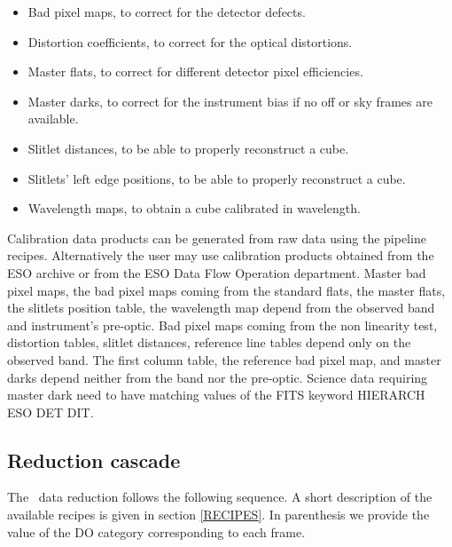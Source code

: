 \begin{itemize}
\begin{itemize}
\item Bad pixel maps, to correct for the detector defects.
\item Distortion coefficients, to correct for the optical distortions.
\item Master flats, to correct for different detector pixel efficiencies.
\item Master darks, to correct for the instrument bias if no off or sky 
frames are available.
\item Slitlet distances, to be able to properly reconstruct a cube.
\item Slitlets' left edge positions, to be able to properly reconstruct a cube.
\item Wavelength maps, to obtain a cube calibrated in wavelength.
\end{itemize}
\end{itemize}
Calibration data products can be generated from raw data using the pipeline 
recipes. Alternatively the user may use calibration products obtained from 
the ESO archive or from the ESO Data Flow Operation department.
Master bad pixel maps, the bad pixel maps coming from the standard flats, 
the master flats, the slitlets position table, the wavelength map depend 
from the observed band and instrument's pre-optic. Bad pixel maps coming 
from the non linearity test, distortion tables, slitlet distances, reference 
line tables depend only on the observed band. The first column table, the 
reference bad pixel map, and master darks depend neither from the 
band nor the pre-optic. Science data requiring master dark need to have 
matching values of the FITS keyword HIERARCH ESO DET DIT.



\subsection{Reduction cascade} 


The \instname\, data reduction follows the following sequence. A short 
description of the available recipes is given in section \ref{RECIPES}.
In parenthesis we provide the value of the DO category corresponding to each 
frame.



